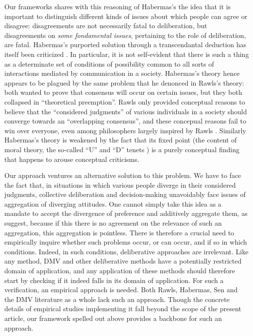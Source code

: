 \documentclass[version=3.21, pagesize, twoside=off, bibliography=totoc, DIV=calc, fontsize=12pt, a4paper, french, english]{scrartcl}
\begin{document}
Our frameworks shares with this reasoning of Habermas's the idea that it is important to distinguish different kinds of issues about which people can agree or disagree: disagreements are not necessarily fatal to deliberation, but disagreements on \emph{some fondamental issues}, pertaining to the role of deliberation, are fatal. Habermas's purported solution through a transcendantal deduction has itself been criticized \citep{heath_communicative_2001}. 
In particular, it is not self-evident that there is such a thing as a determinate set of conditions of possibility common to all sorts of interactions mediated by communication in a society. 
Habermas's theory hence appears to be plagued by the same problem that he denonced in Rawls's theory: both wanted to prove that consensus will occur on certain issues, but they both collapsed in ``theoretical preemption''. Rawls only provided conceptual reasons to believe that the “considered judgments” of various individuals in a society should converge towards an “overlapping consensus”, and these concepual reasons fail to win over everyone, even among philosophers largely inspired by Rawls \citep{estlund_insularity_1998, estlund_democratic_2009}. 
Similarly Habermas's theory is weakened by the fact that its fixed point (the content of moral theory, the so-called “U” and “D” tenets \citep{habermas_moralbewustsein_1983}) is a purely conceptual finding that happens to arouse conceptual criticisms.

Our approach ventures an alternative solution to this problem. 
We have to face the fact that, in situations in which various people diverge in their considered judgments, collective deliberation and decision-making unavoidably face issues of aggregation of diverging attitudes. 
One cannot simply take this idea as a mandate to accept the divergence of preference and additively aggregate them, as \citeauthor{bartkowski_beyond_2018} suggest, because if this there is no agreement on the relevance of such an aggregation, this aggregation is pointless. 
There is therefore a crucial need to empirically inquire whether such problems occur, or can occur, and if so in which conditions. Indeed, in such conditions, deliberative approaches are irrelevant. 
Like any method, DMV and other deliberative methods have a potentially restricted domain of application, and any application of these methods should therefore start by checking if it indeed falls in its domain of application. 
For such a verification, an empirical approach is needed. 
Both Rawls, Habermas, Sen and the DMV literature as a whole lack such an approach. 
Though the concrete details of empirical studies implementing it fall beyond the scope of the present article, our framework spelled out above provides a backbone for such an approach.
\end{document}
